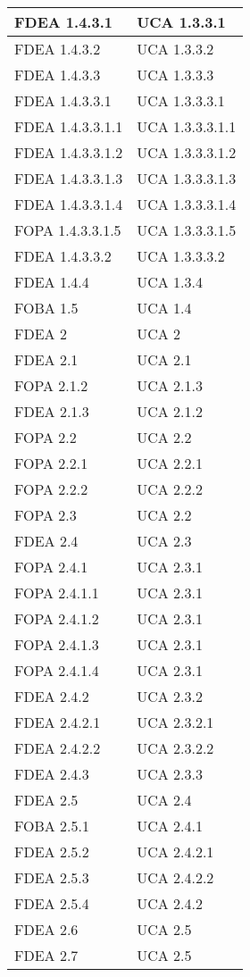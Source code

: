 \begin{longtable}{XX}
\midrule
FDEA 1.4.3.1&UCA 1.3.3.1\\
\midrule
FDEA 1.4.3.2&UCA 1.3.3.2\\
\midrule
FDEA 1.4.3.3&UCA 1.3.3.3\\
\midrule
FDEA 1.4.3.3.1&UCA 1.3.3.3.1\\
\midrule
FDEA 1.4.3.3.1.1&UCA 1.3.3.3.1.1\\
\midrule
FDEA 1.4.3.3.1.2&UCA 1.3.3.3.1.2\\
\midrule
FDEA 1.4.3.3.1.3&UCA 1.3.3.3.1.3\\
\midrule
FDEA 1.4.3.3.1.4&UCA 1.3.3.3.1.4\\
\midrule
FOPA 1.4.3.3.1.5&UCA 1.3.3.3.1.5\\
\midrule
FDEA 1.4.3.3.2&UCA 1.3.3.3.2\\
\midrule
FDEA 1.4.4&UCA 1.3.4\\
\midrule
FOBA 1.5&UCA 1.4\\
\midrule
FDEA 2&UCA 2\\
\midrule
FDEA 2.1&UCA 2.1\\
\midrule
FOPA 2.1.2&UCA 2.1.3\\
\midrule
FDEA 2.1.3&UCA 2.1.2\\
\midrule
FOPA 2.2&UCA 2.2\\
\midrule
FOPA 2.2.1&UCA 2.2.1\\
\midrule
FOPA 2.2.2&UCA 2.2.2\\
\midrule
FOPA 2.3&UCA 2.2\\
\midrule
FDEA 2.4&UCA 2.3\\
\midrule
FOPA 2.4.1&UCA 2.3.1\\
\midrule
FOPA 2.4.1.1&UCA 2.3.1\\
\midrule
FOPA 2.4.1.2&UCA 2.3.1\\
\midrule
FOPA 2.4.1.3&UCA 2.3.1\\
\midrule
FOPA 2.4.1.4&UCA 2.3.1\\
\midrule
FDEA 2.4.2&UCA 2.3.2\\
\midrule
FDEA 2.4.2.1&UCA 2.3.2.1\\
\midrule
FDEA 2.4.2.2&UCA 2.3.2.2\\
\midrule
FDEA 2.4.3&UCA 2.3.3\\
\midrule
FDEA 2.5&UCA 2.4\\
\midrule
FOBA 2.5.1&UCA 2.4.1\\
\midrule
FDEA 2.5.2&UCA 2.4.2.1\\
\midrule
FDEA 2.5.3&UCA 2.4.2.2\\
\midrule
FDEA 2.5.4&UCA 2.4.2\\
\midrule
FDEA 2.6&UCA 2.5\\
\midrule
FDEA 2.7&UCA 2.5\\
\midrule


\end{longtable}
